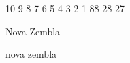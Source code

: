 \documentclass[12pt]{article}
\begin{document}
{


  \selectfont
  
10 9 8 7 6 5 4 3 2 1 88 28 27

{\Huge Nova Zembla}

{\Huge nova zembla}

}
\end{document}
